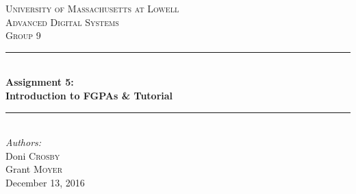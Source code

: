 \documentclass{scrreprt}
\begin{document}

\begin{titlepage}
\newcommand{\HRule}{\rule{\linewidth}{0.5mm}} %

\center %
 

\textsc{\LARGE University of Massachusetts at Lowell}\\[1.5cm] %
\textsc{\Large Advanced Digital Systems}\\[0.5cm] %
\textsc{\large Group 9}\\[0.5cm] %


\HRule \\[0.4cm]
{ \huge \bfseries Assignment 5:\\ Introduction to FGPAs \& Tutorial}\\[0.4cm] %
\HRule \\[1.5cm]
 

\Large \emph{Authors:}\\
Doni \textsc{Crosby}\\
Grant \textsc{Moyer}\\[3cm]


{\large December 13, 2016}\\[3cm] %


 

\vfill %

\end{titlepage}
\end{document}
